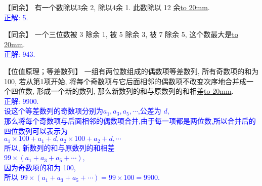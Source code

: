 \item {
    【同余】
    有一个数除以3余 2, 除以4余 1. 此数除以 12 余\underline{\hbox to 20mm{}}.
    \ifshowSolution
        \\\fangsong{}\textcolor{blue}{
            正解: 5.
        }
    \else
        \vspace{1cm}
    \fi
}

\item {
    【同余】
    一个三位数被 3 除余 1, 被 5 除余 3, 被 7 除余 5, 这个数最大是\underline{\hbox to 20mm{}}.
    \ifshowSolution
        \\\fangsong{}\textcolor{blue}{
            正解: 943.
        }
    \else
        \vspace{1cm}
    \fi
}

\item {
    【位值原理；等差数列】
    一组有两位数组成的偶数项等差数列, 所有奇数项的和为100, 若从第1项开始, 将每个奇数项与它后面相邻的偶数项不改变次序地合并成一个四位数, 形成一个新的数列, 那么新数列的和与原数列的和相差\underline{\hbox to 20mm{}}.
    \ifshowSolution
        \\\fangsong{}\textcolor{blue}{
            正解: 9900.\\
            设这个等差数列的奇数项分别为$a_1,a_3,a_5,\cdots$,公差为 $d$,\\
            那么将每个奇数项与后面相邻的偶数项合并,由于每一项都是两位数,所以合并后的四位数列可以表示为\\
            $a_1\times 100 + a_1+d, a_2\times 100 + a_2 + d,\cdots$\\
            所以, 新数列的和与原数列的和相差\\
            $99\times (a_1+a_3+a_5+\cdots)$,\\
            因为奇数项的和为 100, \\
            所以 $99\times (a_1+a_3+a_5+\cdots) = 99\times 100 = 9900$.
        }
    \else
        \vspace{1cm}
    \fi
}

